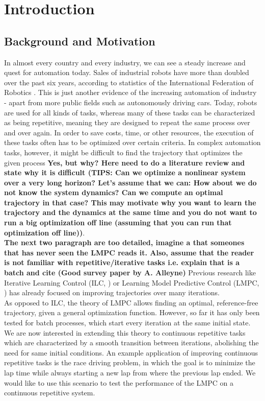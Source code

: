 \chapter{Introduction}
\section{Background and Motivation}
In almost every country and every industry, we can see a steady increase and quest for automation today. Sales of industrial robots have more than doubled over the past six years, according to statistics of the International Federation of Robotics \cite{IFR2016}. This is just another evidence of the increasing automation of industry - apart from more public fields such as autonomously driving cars. Today, robots are used for all kinds of tasks, whereas many of these tasks can be characterized as being repetitive, meaning they are designed to repeat the same process over and over again. In order to save costs, time, or other resources, the execution of these tasks often has to be optimized over certain criteria. In complex automation tasks, however, it might be difficult to find the trajectory that optimizes the given process {\bfseries{Yes, but why? Here need to do a literature review and state why it is difficult (TIPS: Can we optimize a nonlinear system over a very long horizon? Let's assume that we can: How about we do not know the system dynamics? Can we compute an optimal trajectory in that case? This may motivate why you want to learn the trajectory and the dynamics at the same time and you do not want to run a big optimization off line (assuming that you can run that optimization off line))}}. \\
{\bfseries{The next two paragraph are too detailed, imagine a that someones that has never seen the LMPC reads it. Also, assume that the reader is not familiar with repetitive/iterative tasks i.e. explain that is a batch and cite (Good survey paper by A. Alleyne)}}
Previous research like Iterative Learning Control (ILC, \cite{Lee2007}) or Learning Model Predictive Control (LMPC, \cite{Rosolia2016}) has already focused on improving trajectories over many iterations.\\
As opposed to ILC, the theory of LMPC allows finding an optimal, reference-free trajectory, given a general optimization function. However, so far it has only been tested for batch processes, which start every iteration at the same initial state.\\
We are now interested in extending this theory to continuous repetitive tasks which are characterized by a smooth transition between iterations, abolishing the need for same initial conditions.
An example application of improving continuous repetitive tasks is the race driving problem, in which the goal is to minimize the lap time while always starting a new lap from where the previous lap ended. We would like to use this scenario to test the performance of the LMPC on a continuous repetitive system.

